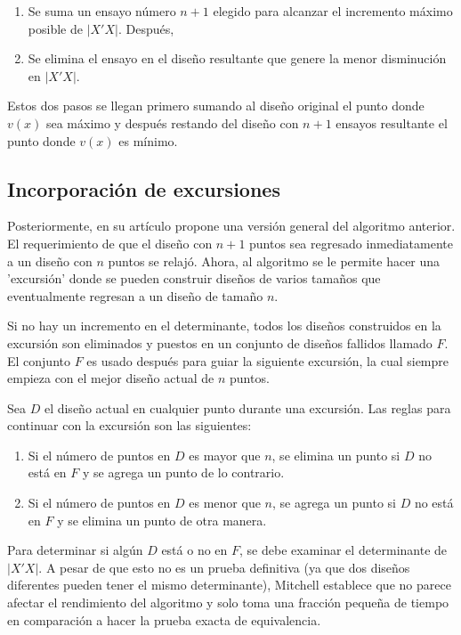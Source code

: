 \begin{enumerate}
	\item Se suma un ensayo número $n+1$ elegido para alcanzar el incremento máximo posible de $|X'X|$. Después, 
	\item Se elimina el ensayo en el diseño resultante que genere la menor disminución en  $|X'X|$. 
\end{enumerate}

Estos dos pasos se llegan primero sumando al diseño original el punto donde $v(x)$ sea máximo y después restando del diseño con $n+1$ ensayos resultante el punto donde $v(x)$ es mínimo.

\subsection{Incorporación de excursiones}

Posteriormente, en su artículo \cite{mitchelldetmax} propone una versión general del algoritmo anterior. El requerimiento de que el diseño con $n+1$ puntos sea regresado inmediatamente a un diseño con $n$ puntos se relajó. Ahora, al algoritmo se le permite hacer una 'excursión' donde se pueden construir diseños de varios tamaños que eventualmente regresan a un diseño de tamaño $n$.  

Si no hay un incremento en el determinante, todos los diseños construidos en la excursión son eliminados y puestos en un conjunto de diseños fallidos llamado $F$. El conjunto $F$ es usado después para guiar la siguiente excursión, la cual siempre empieza con el mejor diseño actual de $n$ puntos. 

Sea $D$ el diseño actual en cualquier punto durante una excursión. Las reglas para continuar con la excursión son las siguientes:

\begin{enumerate}
	\item Si el número de puntos en $D$ es mayor que $n$, se elimina un punto si $D$ no está en $F$ y se agrega un punto de lo contrario. 
	
	\item Si el número de puntos en $D$ es menor que $n$, se agrega un punto si $D$ no está en $F$ y se elimina un punto de otra manera. 
\end{enumerate}

Para determinar si algún $D$ está o no en $F$, se debe examinar el determinante de $|X'X|$. A pesar de que esto no es un prueba definitiva (ya que dos diseños diferentes pueden tener el mismo determinante), Mitchell establece que no parece afectar el rendimiento del algoritmo y solo toma una fracción pequeña de tiempo en comparación a hacer la prueba exacta de equivalencia.

